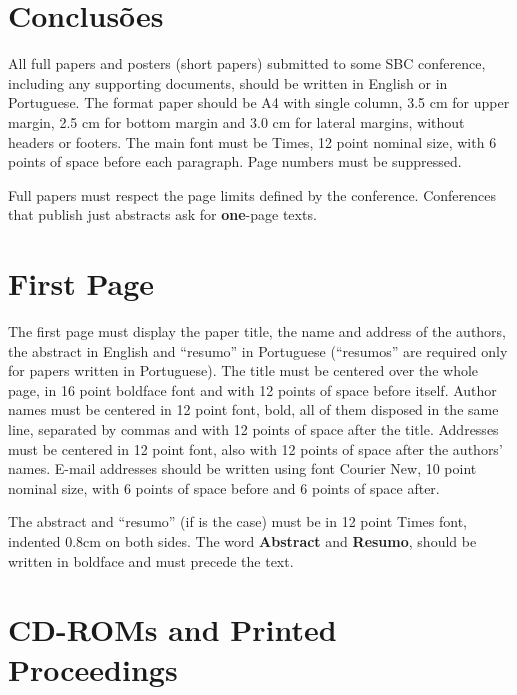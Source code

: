 \documentclass[12pt]{article}
\begin{document}

\section{Conclusões}




All full papers and posters (short papers) submitted to some SBC conference,
including any supporting documents, should be written in English or in
Portuguese. The format paper should be A4 with single column, 3.5 cm for upper
margin, 2.5 cm for bottom margin and 3.0 cm for lateral margins, without
headers or footers. The main font must be Times, 12 point nominal size, with 6
points of space before each paragraph. Page numbers must be suppressed.

Full papers must respect the page limits defined by the conference.
Conferences that publish just abstracts ask for \textbf{one}-page texts.

\section{First Page} \label{sec:firstpage}

The first page must display the paper title, the name and address of the
authors, the abstract in English and ``resumo'' in Portuguese (``resumos'' are
required only for papers written in Portuguese). The title must be centered
over the whole page, in 16 point boldface font and with 12 points of space
before itself. Author names must be centered in 12 point font, bold, all of
them disposed in the same line, separated by commas and with 12 points of
space after the title. Addresses must be centered in 12 point font, also with
12 points of space after the authors' names. E-mail addresses should be
written using font Courier New, 10 point nominal size, with 6 points of space
before and 6 points of space after.

The abstract and ``resumo'' (if is the case) must be in 12 point Times font,
indented 0.8cm on both sides. The word \textbf{Abstract} and \textbf{Resumo},
should be written in boldface and must precede the text.

\section{CD-ROMs and Printed Proceedings}
\end{document}
